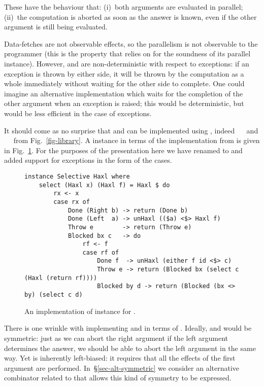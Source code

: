 \noindent
These have the behaviour that: (i)~both arguments are evaluated in parallel;
(ii)~the computation is aborted as soon as the answer is known, even if the
other argument is still being evaluated.

Data-fetches are not observable effects, so the parallelism is not
observable to the programmer (this is the property that \Haxl relies
on for the soundness of its parallel 
instance). However,  and  are non-deterministic with
respect to exceptions: if an exception is thrown by either side, it
will be thrown by the computation as a whole immediately without
waiting for the other side to complete.  One could imagine an
alternative implementation which waits for the completion of the other
argument when an exception is raised; this would be deterministic, but
would be less efficient in the case of exceptions.

It should come as no surprise that  and  can be
implemented using , indeed ~\hs{=}~\hs{(<||>)} and
~\hs{=}~\hs{(<&&>)} from Fig.~\ref{fig-library}. A 
instance in terms of the \Haxl implementation from \citet{marlow2014haxl} is
given in Fig.~\ref{fig-haxl-select}.  For the purposes of the presentation
here we have renamed  to  and added support for
exceptions in the form of the  cases.

\begin{figure}
\begin{verbatim}
instance Selective Haxl where
    select (Haxl x) (Haxl f) = Haxl $ do
        rx <- x
        case rx of
            Done (Right b) -> return (Done b)
            Done (Left  a) -> unHaxl (($a) <$> Haxl f)
            Throw e        -> return (Throw e)
            Blocked bx c   -> do
                rf <- f
                case rf of
                    Done f  -> unHaxl (either f id <$> c)
                    Throw e -> return (Blocked bx (select c (Haxl (return rf))))
                    Blocked by d -> return (Blocked (bx <> by) (select c d)
\end{verbatim}
\vspace{-1mm}
\caption{An implementation of  instance for \Haxl.}
\label{fig-haxl-select}
\vspace{-3mm}
\end{figure}

There is one wrinkle with implementing  and 
in terms of . Ideally,  and  would be
symmetric: just as we can abort the right argument if the left
argument determines the answer, we should be able to abort the left
argument in the same way. Yet  is inherently left-biased:
it requires that all the effects of the first argument are performed.
In~\S\ref{sec-alt-symmetric} we consider an alternative combinator
related to  that allows this kind of symmetry to be expressed.

